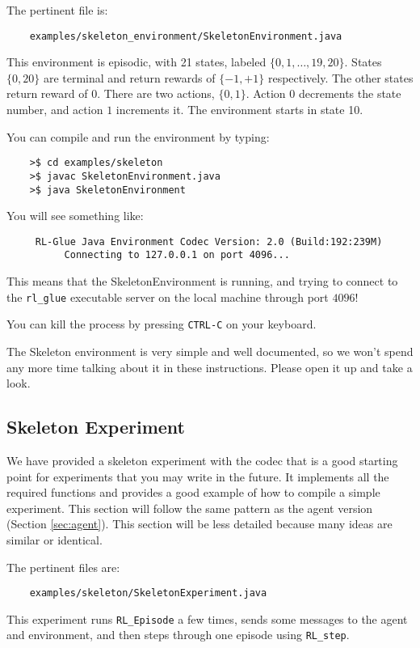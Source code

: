 \documentclass[11pt]{article}
\begin{document}
The pertinent file is:
\begin{verbatim}
	examples/skeleton_environment/SkeletonEnvironment.java
\end{verbatim}

This environment is episodic, with 21 states, labeled $\{0, 1,\ldots,19,20\}$. States $\{0, 20\}$ are terminal and return rewards of $\{-1, +1\}$ respectively.  The other states return reward of $0$.
There are two actions, $\{0, 1\}$.  Action $0$ decrements the state number, and action $1$ increments it. The environment starts in state 10.

You can compile and run the environment by typing:
\begin{verbatim}
	>$ cd examples/skeleton
	>$ javac SkeletonEnvironment.java
	>$ java SkeletonEnvironment
\end{verbatim}

You will see something like:
\begin{verbatim}
     RL-Glue Java Environment Codec Version: 2.0 (Build:192:239M)
          Connecting to 127.0.0.1 on port 4096...
\end{verbatim}

This means that the SkeletonEnvironment is running, and trying to connect to the \texttt{rl\_glue} executable server on the local machine through port $4096$! 

You can kill the process by pressing \texttt{CTRL-C} on your keyboard.


The Skeleton environment is very simple and well documented, so we won't spend any more time talking about it in these instructions.
Please open it up and take a look.

\subsection{Skeleton Experiment}
We have provided a skeleton experiment with the codec that is a good starting point for experiments that you may write in the future.
It implements all the required functions and provides a good example of how to compile a simple experiment.  This section will follow the same 
pattern as the agent version (Section \ref{sec:agent}).  This section will be less detailed because many ideas are similar or identical.

The pertinent files are:
\begin{verbatim}
	examples/skeleton/SkeletonExperiment.java
\end{verbatim}

This experiment runs \texttt{RL\_Episode} a few times, sends some messages to the agent and environment, and then steps through one episode using \texttt{RL\_step}.
\end{document}
